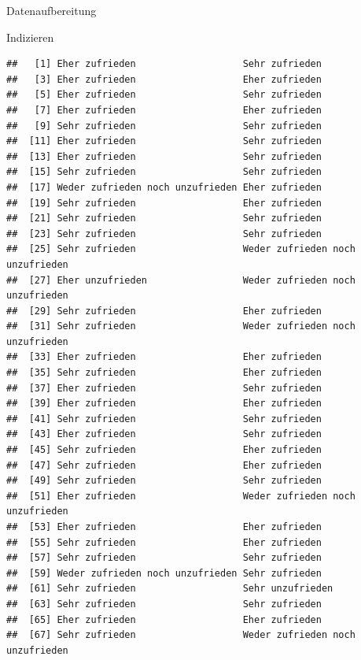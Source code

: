 \documentclass[ignorenonframetext,]{beamer}
\begin{document}
\begin{frame}[fragile]{Datenaufbereitung}
\begin{block}{Indizieren}
\begin{verbatim}
##   [1] Eher zufrieden                   Sehr zufrieden                  
##   [3] Eher zufrieden                   Eher zufrieden                  
##   [5] Eher zufrieden                   Sehr zufrieden                  
##   [7] Eher zufrieden                   Eher zufrieden                  
##   [9] Sehr zufrieden                   Sehr zufrieden                  
##  [11] Eher zufrieden                   Sehr zufrieden                  
##  [13] Eher zufrieden                   Sehr zufrieden                  
##  [15] Sehr zufrieden                   Sehr zufrieden                  
##  [17] Weder zufrieden noch unzufrieden Eher zufrieden                  
##  [19] Sehr zufrieden                   Eher zufrieden                  
##  [21] Sehr zufrieden                   Sehr zufrieden                  
##  [23] Sehr zufrieden                   Sehr zufrieden                  
##  [25] Sehr zufrieden                   Weder zufrieden noch unzufrieden
##  [27] Eher unzufrieden                 Weder zufrieden noch unzufrieden
##  [29] Sehr zufrieden                   Eher zufrieden                  
##  [31] Sehr zufrieden                   Weder zufrieden noch unzufrieden
##  [33] Eher zufrieden                   Eher zufrieden                  
##  [35] Sehr zufrieden                   Eher zufrieden                  
##  [37] Eher zufrieden                   Sehr zufrieden                  
##  [39] Eher zufrieden                   Eher zufrieden                  
##  [41] Sehr zufrieden                   Sehr zufrieden                  
##  [43] Eher zufrieden                   Sehr zufrieden                  
##  [45] Sehr zufrieden                   Eher zufrieden                  
##  [47] Sehr zufrieden                   Eher zufrieden                  
##  [49] Sehr zufrieden                   Sehr zufrieden                  
##  [51] Eher zufrieden                   Weder zufrieden noch unzufrieden
##  [53] Eher zufrieden                   Eher zufrieden                  
##  [55] Sehr zufrieden                   Eher zufrieden                  
##  [57] Sehr zufrieden                   Sehr zufrieden                  
##  [59] Weder zufrieden noch unzufrieden Sehr zufrieden                  
##  [61] Sehr zufrieden                   Sehr unzufrieden                
##  [63] Sehr zufrieden                   Sehr zufrieden                  
##  [65] Eher zufrieden                   Eher zufrieden                  
##  [67] Sehr zufrieden                   Weder zufrieden noch unzufrieden

\end{verbatim}
\end{block}
\end{frame}
\end{document}
